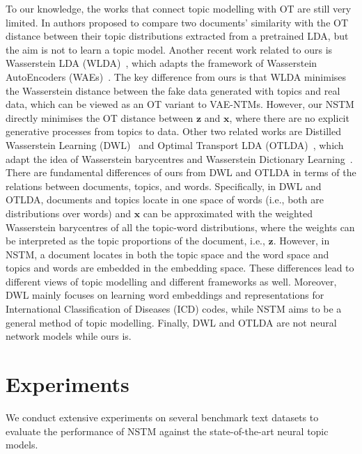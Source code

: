 \documentclass{article}
\renewcommand{\vec}{\boldsymbol}
\begin{document}
To our knowledge, the works that connect topic modelling with OT are still very limited.
In \cite{yurochkin2019hierarchical} authors proposed to compare two documents' similarity with the OT distance between their topic distributions extracted from a pretrained LDA, but the aim is not to learn a topic model.
Another recent work related to ours is Wasserstein LDA (WLDA)~\citep{nan2019topic}, which adapts the framework of Wasserstein AutoEncoders (WAEs)~\citep{tolstikhin2017wasserstein}.
The key difference from ours is that WLDA minimises the Wasserstein distance between the fake data generated with topics and real data, which can be viewed as an OT variant to VAE-NTMs.
However, our NSTM directly minimises the OT distance between $\vec{z}$ and $\vec{x}$, where there are no explicit generative processes from topics to data. Other two related works are Distilled Wasserstein Learning (DWL)~\citep{xu2018distilled} and Optimal Transport LDA (OTLDA)~\citep{huynh2020otlda}, which adapt the idea of Wasserstein barycentres and Wasserstein Dictionary Learning~\citep{rolet2016fast,schmitz2018wasserstein}. 
There are fundamental differences of ours from DWL and OTLDA in terms of the relations between documents, topics, and words. Specifically, 
in DWL and OTLDA, documents and topics locate in one space of words (i.e., both are distributions over words) and $\vec{x}$ can be approximated with the weighted Wasserstein barycentres of all the topic-word distributions, where the weights can be interpreted as the topic proportions of the document, i.e., $\vec{z}$.
However, in NSTM, a document locates in both the topic space and the word space and topics and words are embedded in the embedding space.
These differences lead to different views of topic modelling and different frameworks as well. Moreover, DWL mainly focuses on learning word embeddings and representations for International Classification of Diseases (ICD) codes, while NSTM aims to be a general method of topic modelling. Finally, DWL and OTLDA are not neural network models while ours is.





\section{Experiments}

We conduct extensive experiments on several benchmark text datasets to evaluate the performance of NSTM against the state-of-the-art neural topic models.
\end{document}
